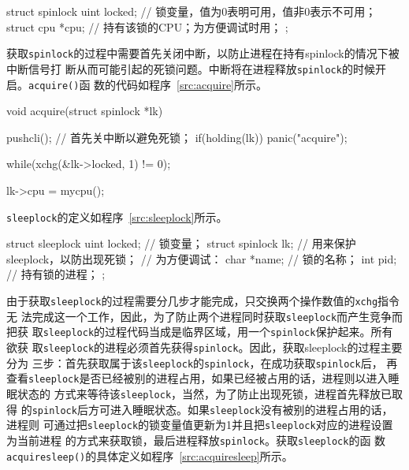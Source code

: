 \documentclass{swfuthesism}
\begin{document}
\begin{listing}
  \begin{codeblock}
\begin{ccode}
struct spinlock {
  uint locked; // 锁变量，值为0表明可用，值非0表示不可用；
  struct cpu *cpu; // 持有该锁的CPU；为方便调试时用；
};
\end{ccode}    
  \end{codeblock}
  \label{src:spinlock}
\end{listing}

获取\texttt{spinlock}的过程中需要首先关闭中断，以防止进程在持有spinlock的情况下被中断信号打
断从而可能引起的死锁问题。中断将在进程释放\texttt{spinlock}的时候开启。\texttt{acquire()}函
数的代码如程序~\ref{src:acquire}所示。

\begin{listing}%
  \begin{codeblock}
\begin{ccode}
void acquire(struct spinlock *lk) {
  pushcli(); // 首先关中断以避免死锁；
  if(holding(lk))
    panic("acquire");

  while(xchg(&lk->locked, 1) != 0);

  lk->cpu = mycpu();
}
\end{ccode}
  \end{codeblock}
  \label{src:acquire}
\end{listing}

\texttt{sleeplock}的定义如程序~\ref{src:sleeplock}所示。

\begin{listing}%
  \begin{codeblock}
\begin{ccode}
struct sleeplock {
  uint locked;        // 锁变量；
  struct spinlock lk; // 用来保护sleeplock，以防出现死锁；
  // 为方便调试：
  char *name;         // 锁的名称；
  int pid;            // 持有锁的进程；
};
\end{ccode}
  \end{codeblock}
  \label{src:sleeplock}
\end{listing}

由于获取\texttt{sleeplock}的过程需要分几步才能完成，只交换两个操作数值的\texttt{xchg}指令无
法完成这一个工作，因此，为了防止两个进程同时获取\texttt{sleeplock}而产生竞争而把获
取\texttt{sleeplock}的过程代码当成是临界区域，用一个\texttt{spinlock}保护起来。所有欲获
取\texttt{sleeplock}的进程必须首先获得\texttt{spinlock}。因此，获取sleeplock的过程主要分为
三步：首先获取属于该\texttt{sleeplock}的\texttt{spinlock}，在成功获取\texttt{spinlock}后，
再查看\texttt{sleeplock}是否已经被别的进程占用，如果已经被占用的话，进程则以进入睡眠状态的
方式来等待该\texttt{sleeplock}，当然，为了防止出现死锁，进程首先释放已取得
的\texttt{spinlock}后方可进入睡眠状态。如果\texttt{sleeplock}没有被别的进程占用的话，进程则
可通过把\texttt{sleeplock}的锁变量值更新为1并且把\texttt{sleeplock}对应的进程设置为当前进程
的方式来获取锁，最后进程释放\texttt{spinlock}。获取\texttt{sleeplock}的函
数\texttt{acquiresleep()}的具体定义如程序~\ref{src:acquiresleep}所示。
\end{document}
